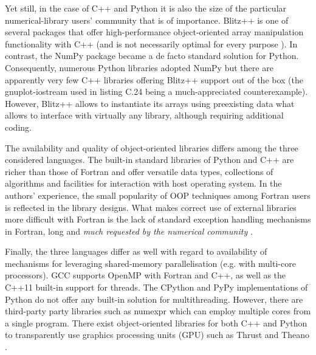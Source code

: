 \documentclass[final,5p,times,twocolumn]{elsarticle}
\begin{document}
  Yet still, in the case of C++ and Python it is also the size of the particular
    numerical-library users' community that is of importance.
  Blitz++ is one of several packages that offer high-performance object-oriented
    array manipulation functionality with C++ (and is not necessarily optimal for every
    purpose \citep{Iglberger_et_al_2012}).
  In contrast, the NumPy package became a de facto standard solution for Python.
  Consequently, numerous Python libraries adopted NumPy but
    there are apparently very few C++ libraries offering Blitz++ support out of the box
    (the gnuplot-iostream used in listing C.24 being a much-appreciated counterexample).
  However, Blitz++ allows to instantiate its arrays using preexisting data what
    allows to interface with virtually any library, although requiring additional
    coding.
  
  The availability and quality of object-oriented 
    libraries differs among the three considered languages.
  The built-in standard libraries of Python and C++ are richer than
    those of Fortran and offer versatile data types, collections of
    algorithms and facilities for interaction with host operating system.
  In the authors' experience, the small popularity of OOP techniques among
    Fortran users is reflected in the library designs.
  What makes correct use of external libraries more difficult with Fortran
    is the lack of standard exception handling mechanisms in Fortran,
    long and {\em much requested by the numerical community} \citep[][Foreword]{Press_et_al_1996}.

  Finally, the three languages differ as well with regard to availability of 
    mechanisms for leveraging shared-memory parallelisation (e.g. with multi-core processors).
  GCC supports OpenMP with Fortran and C++, as well as the C++11 built-in support for threads.
  The CPython and PyPy implementations of Python do not offer any
    built-in solution for multithreading. 
  However, there are third-party party libraries such as numexpr which can employ multiple cores from
    a single program.
  There exist object-oriented libraries for both C++ and Python to 
    transparently use graphics processing units (GPU) such as Thrust \citep{Thrust}
    and Theano \citep{Bergstra_et_al_2010}. 
  
\end{document}
